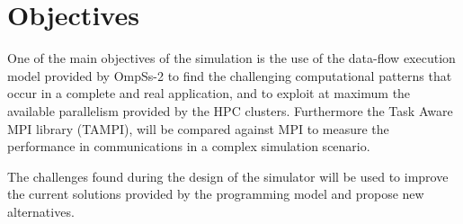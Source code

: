 \section{Objectives}

One of the main objectives of the simulation is the use of the data-flow 
execution model provided by OmpSs-2 to find the challenging computational 
patterns that occur in a complete and real application, and to exploit at 
maximum the available parallelism provided by the HPC clusters.
%
Furthermore the Task Aware MPI library (TAMPI), will be compared against MPI to 
measure the performance in communications in a complex simulation scenario.

The challenges found during the design of the simulator will be used to improve 
the current solutions provided by the programming model and propose new 
alternatives.

